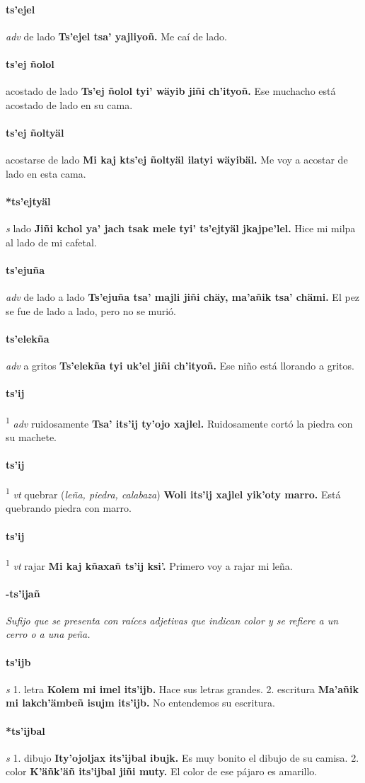 \documentclass{scrbook}
\newcommand{\entry}[1]{\paragraph{#1}}
\newcommand{\onedefinition}[1]{#1.}
\newcommand{\defsuperscript}[1]{\textsuperscript{1}}
\newcommand{\nontranslationdef}[1]{\textit{#1}}
\newcommand{\partofspeech}[1]{\textit{#1}}
\newcommand{\spanishtranslation}[1]{#1}
\newcommand{\clarification}[1]{(\textit{#1})}
\newcommand{\cholexample}[1]{\textbf{#1}}
\newcommand{\exampletranslation}[1]{#1}
\begin{document}
\begin{multicols}{2}
\entry{ts'ejel}
\partofspeech{adv}
\spanishtranslation{de lado}
\cholexample{Ts'ejel tsa' yajliyoñ.}
\exampletranslation{Me caí de lado.}

\entry{ts'ej ñolol}
\spanishtranslation{acostado de lado}
\cholexample{Ts'ej ñolol tyi' wäyib jiñi ch'ityoñ.}
\exampletranslation{Ese muchacho está acostado de lado en su cama.}

\entry{ts'ej ñoltyäl}
\spanishtranslation{acostarse de lado}
\cholexample{Mi kaj kts'ej ñoltyäl ilatyi wäyibäl.}
\exampletranslation{Me voy a acostar de lado en esta cama.}

\entry{*ts'ejtyäl}
\partofspeech{s}
\spanishtranslation{lado}
\cholexample{Jiñi kchol ya' jach tsak mele tyi' ts'ejtyäl jkajpe'lel.}
\exampletranslation{Hice mi milpa al lado de mi cafetal.}

\entry{ts'ejuña}
\partofspeech{adv}
\spanishtranslation{de lado a lado}
\cholexample{Ts'ejuña tsa' majli jiñi chäy, ma'añik tsa' chämi.}
\exampletranslation{El pez se fue de lado a lado, pero no se murió.}

\entry{ts'elekña}
\partofspeech{adv}
\spanishtranslation{a gritos}
\cholexample{Ts'elekña tyi uk'el jiñi ch'ityoñ.}
\exampletranslation{Ese niño está llorando a gritos.}

\entry{ts'ij}
\defsuperscript{1}
\partofspeech{adv}
\spanishtranslation{ruidosamente}
\cholexample{Tsa' its'ij ty'ojo xajlel.}
\exampletranslation{Ruidosamente cortó la piedra con su machete.}

\entry{ts'ij}
\defsuperscript{2}
\partofspeech{vt}
\spanishtranslation{quebrar}
\clarification{leña, piedra, calabaza}
\cholexample{Woli its'ij xajlel yik'oty marro.}
\exampletranslation{Está quebrando piedra con marro.}

\entry{ts'ij}
\defsuperscript{3}
\partofspeech{vt}
\spanishtranslation{rajar}
\cholexample{Mi kaj kñaxañ ts'ij ksi'.}
\exampletranslation{Primero voy a rajar mi leña.}

\entry{-ts'ijañ}
\nontranslationdef{Sufijo que se presenta con raíces adjetivas que indican color y se refiere a un cerro o a una peña.}

\entry{ts'ijb}
\partofspeech{s}
\onedefinition{1}
\spanishtranslation{letra}
\cholexample{Kolem mi imel its'ijb.}
\exampletranslation{Hace sus letras grandes.}
\onedefinition{2}
\spanishtranslation{escritura}
\cholexample{Ma'añik mi lakch'ämbeñ isujm its'ijb.}
\exampletranslation{No entendemos su escritura.}

\entry{*ts'ijbal}
\partofspeech{s}
\onedefinition{1}
\spanishtranslation{dibujo}
\cholexample{Ity'ojoljax its'ijbal ibujk.}
\exampletranslation{Es muy bonito el dibujo de su camisa.}
\onedefinition{2}
\spanishtranslation{color}
\cholexample{K'äñk'äñ its'ijbal jiñi muty.}
\exampletranslation{El color de ese pájaro es amarillo.}


\end{multicols}
\end{document}
